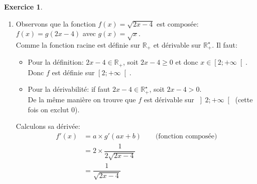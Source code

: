 \documentclass{exam}
\theoremstyle{definition}
\newtheorem{exercice}{Exercice}
\begin{document}
\begin{exercice}
\begin{enumerate}
\begin{align*}
\begin{cases}
            v = \sqrt{x} - 1 & v' = \frac{1}{2\sqrt{x}}
        \end{cases}
        \end{align*}
        Sa dérivée est donc:
        \begin{align*}
            f'(x) &= \frac{u'v - uv'}{v^2} \qquad \text{(produit de deux fonctions $(uv)'$)}\\
            &= \frac{1(\sqrt{x} - 1) - x(\frac{1}{2\sqrt{x}})}{(\sqrt{x} - 1)^2}\\
            &= \frac{\sqrt{x} - 1 - \frac{x}{2\sqrt{x}}}{(\sqrt{x} - 1)^2}\\
            &= \frac{\sqrt{x} - 1 - \frac{\sqrt{x}}{2}}{(\sqrt{x} - 1)^2}\\
            &= \frac{\frac{\sqrt{x}}{2} - 1}{(\sqrt{x} - 1)^2}\\
            &= \frac{\sqrt{x} - 2}{2(\sqrt{x} - 1)^2}
        \end{align*}
        \item Observons que la fonction $f(x) = \sqrt{2x - 4}$ est composée: $f(x) = g(2x - 4)$ avec $g(x) = \sqrt{x}$.\\
        Comme la fonction racine est définie sur $\mathbb{R}_+$ et dérivable sur $\mathbb{R}_+^\star$. Il faut:
        \begin{itemize}
            \item Pour la définition: $2x - 4 \in \mathbb{R}_+$, soit $2x - 4 \geq 0$ et donc $x \in \left[2; +\infty\right[$.\\ Donc $f$ est définie sur $\left[2; +\infty\right[$.
            \item Pour la dérivabilité: if faut $2x - 4 \in \mathbb{R}_+^\star$, soit $2x - 4 > 0$.\\
            De la même manière on trouve que $f$ est dérivable sur $\left]2; +\infty\right[$ (cette fois on exclut $0$).
        \end{itemize}
        Calculons sa dérivée:
        \begin{align*}
            f'(x) &= a \times g'(ax + b) \qquad \text{(fonction composée)}\\
            &= 2 \times \dfrac{1}{2\sqrt{2x-4}}\\
            &= \dfrac{1}{\sqrt{2x - 4}}
        \end{align*}
    \end{enumerate}
\end{exercice}
\end{document}
